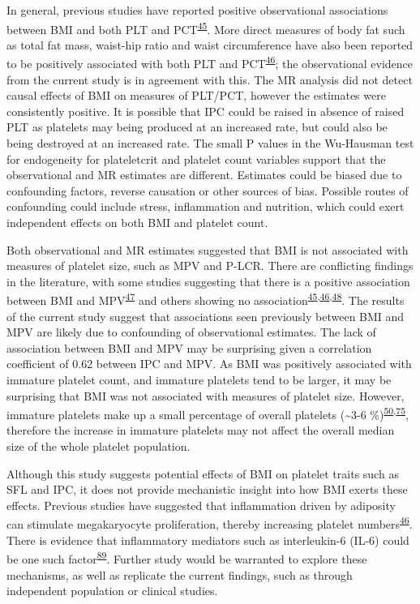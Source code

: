 \documentclass[11pt,twoside]{bristolthesis}
\begin{document}
In general, previous studies have reported positive observational associations between BMI and both PLT and PCT\textsuperscript{\protect\hyperlink{ref-Furuncuoglu2016}{45}}. More direct measures of body fat such as total fat mass, waist-hip ratio and waist circumference have also been reported to be positively associated with both PLT and PCT\textsuperscript{\protect\hyperlink{ref-Han2018a}{46}}; the observational evidence from the current study is in agreement with this. The MR analysis did not detect causal effects of BMI on measures of PLT/PCT, however the estimates were consistently positive. It is possible that IPC could be raised in absence of raised PLT as platelets may being produced at an increased rate, but could also be being destroyed at an increased rate. The small P values in the Wu-Hausman test for endogeneity for plateletcrit and platelet count variables support that the observational and MR estimates are different. Estimates could be biased due to confounding factors, reverse causation or other sources of bias. Possible routes of confounding could include stress, inflammation and nutrition, which could exert independent effects on both BMI and platelet count.

Both observational and MR estimates suggested that BMI is not associated with measures of platelet size, such as MPV and P-LCR. There are conflicting findings in the literature, with some studies suggesting that there is a positive association between BMI and MPV\textsuperscript{\protect\hyperlink{ref-Coban2005}{47}} and others showing no association\textsuperscript{\protect\hyperlink{ref-Furuncuoglu2016}{45},\protect\hyperlink{ref-Han2018a}{46},\protect\hyperlink{ref-Heffron2018}{48}}. The results of the current study suggest that associations seen previously between BMI and MPV are likely due to confounding of observational estimates. The lack of association between BMI and MPV may be surprising given a correlation coefficient of 0.62 between IPC and MPV. As BMI was positively associated with immature platelet count, and immature platelets tend to be larger, it may be surprising that BMI was not associated with measures of platelet size. However, immature platelets make up a small percentage of overall platelets (\textasciitilde3-6 \%)\textsuperscript{\protect\hyperlink{ref-Ibrahim2014}{50},\protect\hyperlink{ref-Bernlochner2015a}{75}}, therefore the increase in immature platelets may not affect the overall median size of the whole platelet population.

Although this study suggests potential effects of BMI on platelet traits such as SFL and IPC, it does not provide mechanistic insight into how BMI exerts these effects. Previous studies have suggested that inflammation driven by adiposity can stimulate megakaryocyte proliferation, thereby increasing platelet numbers\textsuperscript{\protect\hyperlink{ref-Han2018a}{46}}. There is evidence that inflammatory mediators such as interleukin-6 (IL-6) could be one such factor\textsuperscript{\protect\hyperlink{ref-Kaser2001}{89}}. Further study would be warranted to explore these mechanisms, as well as replicate the current findings, such as through independent population or clinical studies.
\end{document}
